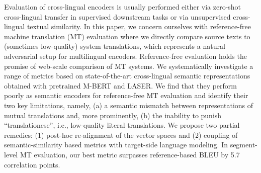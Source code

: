 Evaluation of cross-lingual encoders is usually performed either via zero-shot cross-lingual transfer in supervised downstream tasks or via unsupervised cross-lingual textual similarity. In this paper, we concern ourselves with reference-free machine translation (MT) evaluation where we directly compare source texts to (sometimes low-quality) system translations, which represents a natural adversarial setup for multilingual encoders. Reference-free evaluation holds the promise of web-scale comparison of MT systems. We systematically investigate a range of metrics based on state-of-the-art cross-lingual semantic representations obtained with pretrained M-BERT and LASER. We find that they perform poorly as semantic encoders for reference-free MT evaluation and identify their two key limitations, namely, (a) a semantic mismatch between representations of mutual translations and, more prominently, (b) the inability to punish ``translationese'', i.e., low-quality literal translations. We propose two partial remedies: (1) post-hoc re-alignment of the vector spaces and (2) coupling of semantic-similarity based metrics with target-side language modeling. In segment-level MT evaluation, our best metric surpasses reference-based BLEU by 5.7 correlation points.
